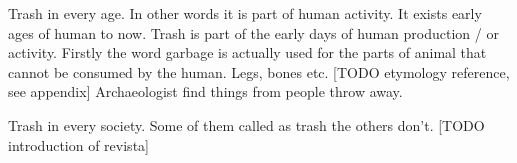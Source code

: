 

Trash in every age. In other words it is part of human activity. It exists early ages of human to now. Trash is part of the early days of human production / or activity. Firstly the word garbage is actually used for the parts of animal that cannot be consumed by the human. Legs, bones etc. [TODO etymology reference, see appendix] Archaeologist find things from people throw away.

Trash in every society. Some of them called as trash the others don't. [TODO introduction of revista]


